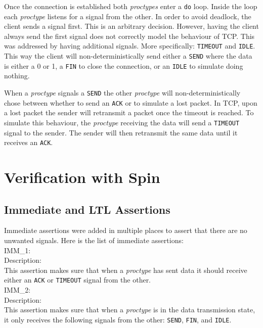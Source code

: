 \documentclass{WigReport}
\begin{document}
Once the connection is established both \textit{proctypes} enter a \verb|do|
loop. Inside the loop each \textit{proctype} listens for a signal from the
other. In order to avoid deadlock, the client sends a signal first. This is an
arbitrary decision. However, having the client always send the first signal
does not correctly model the behaviour of TCP. This was addressed by having
additional signals. More specifically: \verb|TIMEOUT| and \verb|IDLE|. This
way the client will non-deterministically send either a \verb|SEND| where the
data is either a 0 or 1, a \verb|FIN| to close the connection, or an
\verb|IDLE| to simulate doing nothing.

When a \textit{proctype} signals a \verb|SEND| the other \textit{proctype}
will non-deterministically chose between whether to send an \verb|ACK| or to
simulate a lost packet. In TCP, upon a lost packet the sender will retransmit
a packet once the timeout is reached. To simulate this behaviour, the
\textit{proctype} receiving the data will send a \verb|TIMEOUT| signal to
the sender. The sender will then retransmit the same data until it receives
an \verb|ACK|.

\section{Verification with Spin}

\subsection{Immediate and LTL Assertions}

Immediate assertions were added in multiple places to assert that there are no unwanted signals. Here is the list of immediate assertions:
\\

IMM\_1:\\
Description:\\
This assertion makes sure that when a \textit{proctype} has sent data it should receive either an \verb|ACK| or \verb|TIMEOUT| signal from the other.
\\

IMM\_2:\\
Description:\\
This assertion makes sure that when a \textit{proctype} is in the data transmission state, it only receives the following signals from the other: \verb|SEND|, \verb|FIN|, and \verb|IDLE|.
\\
\end{document}
